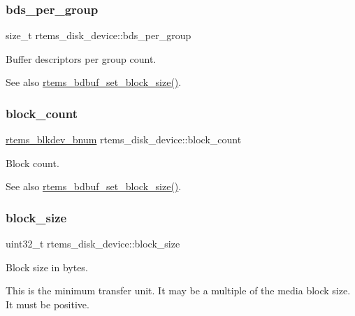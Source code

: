 \subsubsection{\texorpdfstring{bds\_per\_group}{bds\_per\_group}}
{\footnotesize\ttfamily size\+\_\+t rtems\+\_\+disk\+\_\+device\+::bds\+\_\+per\+\_\+group}



Buffer descriptors per group count. 

\begin{DoxySeeAlso}{See also}
\mbox{\hyperlink{group__rtems__bdbuf_ga649b3b4fb368921f579a0204552a7a60}{rtems\+\_\+bdbuf\+\_\+set\+\_\+block\+\_\+size()}}. 
\end{DoxySeeAlso}
\mbox{\label{structrtems__disk__device_ae8d3d63a4eaf18abf1f0f5e22487bedf}} 
\subsubsection{\texorpdfstring{block\_count}{block\_count}}
{\footnotesize\ttfamily \mbox{\hyperlink{group__rtems__disk_ga5fbcfd40b657bff6c54d9e393fab3274}{rtems\+\_\+blkdev\+\_\+bnum}} rtems\+\_\+disk\+\_\+device\+::block\+\_\+count}



Block count. 

\begin{DoxySeeAlso}{See also}
\mbox{\hyperlink{group__rtems__bdbuf_ga649b3b4fb368921f579a0204552a7a60}{rtems\+\_\+bdbuf\+\_\+set\+\_\+block\+\_\+size()}}. 
\end{DoxySeeAlso}
\mbox{\label{structrtems__disk__device_abea6f3f85ded92ea807c60eb0a1de472}} 
\subsubsection{\texorpdfstring{block\_size}{block\_size}}
{\footnotesize\ttfamily uint32\+\_\+t rtems\+\_\+disk\+\_\+device\+::block\+\_\+size}



Block size in bytes. 

This is the minimum transfer unit. It may be a multiple of the media block size. It must be positive.

